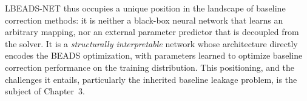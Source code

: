 LBEADS-NET thus occupies a unique position in the landscape of baseline correction methods: it is neither a black-box neural network that learns an arbitrary mapping, nor an external parameter predictor that is decoupled from the solver. It is a \emph{structurally interpretable} network whose architecture directly encodes the BEADS optimization, with parameters learned to optimize baseline correction performance on the training distribution. This positioning, and the challenges it entails, particularly the inherited baseline leakage problem, is the subject of Chapter~3.
